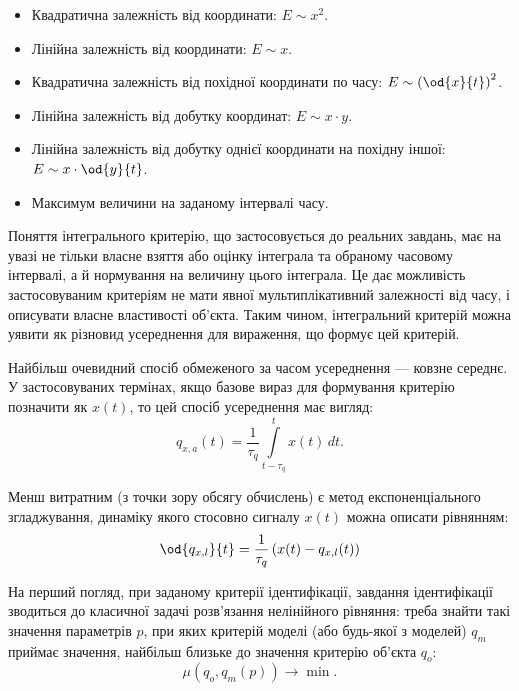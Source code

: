 \documentclass[a4paper,13pt]{atuaref}
\begin{document}
\begin{itemize}

  \item
  Квадратична залежність від координати:
    $E \sim x^2$.

  \item
  Лінійна залежність від координати:
    $E \sim x$.

  \item
  Квадратична залежність від похідної координати по часу:
    $E \sim \left( \od{x}{t}\right)^2$.

  \item
  Лінійна залежність від добутку координат:
    $E \sim x \cdot y$.

  \item
    Лінійна залежність від добутку однієї координати на похідну іншої:
     $E \sim x \cdot \od{y}{t}$.

  \item
  Максимум величини на заданому інтервалі часу.

\end{itemize}

Поняття інтегрального критерію, що застосовується до реальних завдань, має на
увазі не тільки власне взяття або оцінку інтеграла та обраному часовому
інтервалі, а й нормування на величину цього інтеграла. Це дає можливість
застосовуваним критеріям не мати явної мультиплікативний залежності від часу, і
описувати власне властивості об'єкта. Таким чином, інтегральний критерій можна
уявити як різновид усереднення для вираження, що формує цей критерій.

Найбільш очевидний спосіб обмеженого за часом усереднення --- ковзне середнє. У
застосовуваних термінах, якщо базове вираз для формування критерію позначити як
$ x(t)$, то цей спосіб усереднення має вигляд:
%
\begin{equation}
  q_{x,a}(t) =
  \frac{1}{\tau_q}
  \int\limits_{t-\tau_q}^{t} x(t) \, dt.
  \label{atu:eq:moving_avarage}
\end{equation}

Менш витратним (з точки зору обсягу обчислень) є метод експоненціального
згладжування, динаміку якого стосовно сигналу $x(t) $ можна описати
рівнянням:
%
\begin{equation}
\od{q_{x,l}}{t}
=
\frac{1}{\tau_q} \left( x(t) - q_{x,l}(t) \right)
\label{atu:eq:qlin}
\end{equation}

На перший погляд, при заданому критерії ідентифікації, завдання ідентифікації
зводиться до класичної задачі розв'язання нелінійного рівняння: треба знайти
такі значення параметрів $ p $, при яких критерій моделі (або будь-якої з
моделей) $ q_m $ приймає значення, найбільш близьке до значення критерію
об'єкта $ q_o $:
\[
  \mu( q_o, q_m(p) ) \to \min.
\]
\end{document}
